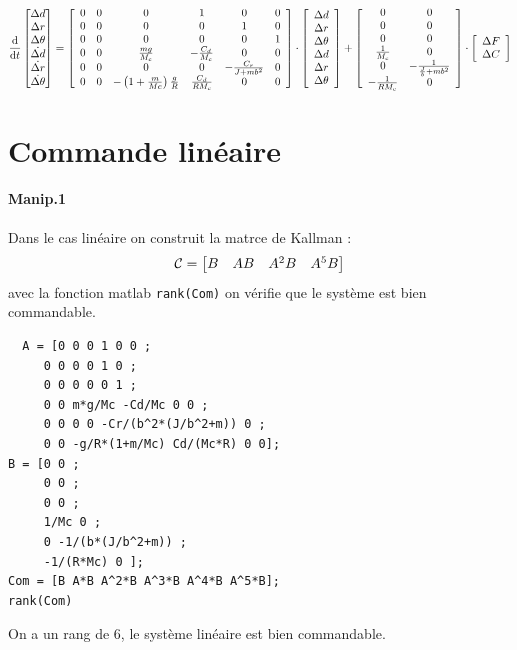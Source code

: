 \documentclass[10pt,a4paper,notitlepage]{article}
\begin{document}
\[
  \frac{\mbox{d}}{\mbox{d} t}\begin{bmatrix} \Delta d \\ \Delta r \\ \Delta\theta \\ \dot{\Delta d}\\ \dot{\Delta r}\\ \dot{\Delta \theta} \end{bmatrix} = 
  \left[ \begin{array}{cccccc}
           {0} & {0} & {0} & {1} & {0} & {0} \\
           {0} & {0} & {0} & {0} & {1} & {0} \\
           {0} & {0} & {0} & {0} & {0} & {1} \\
           {0} & {0} & {\frac{m g}{M_{c}}} & {-\frac{C_{d}}{M_{c}}} & {0} & {0} \\
           {0} & {0} & {0} & {0} & {-\frac{C_{r}}{J+m b^{2}}} & {0} \\
           {0} & {0} & {-\left(1+\frac{m}{M c}\right) \frac{g}{R}} & {\frac{C_{d}}{R M_{c}}} & {0} & {0}
         \end{array}\right] \cdot
       \left[ \begin{array}{c}{\Delta d} \\ {\Delta r} \\ {\Delta \theta} \\ {\Delta d} \\ {\Delta r} \\ {\Delta \theta}\end{array}\right]+
       \left[ \begin{array}{ccc}{0} & {0} \\ {0} & {0} \\ {0} & {0} \\ {\frac{1}{M_{c}}} & {0} \\ {0} & {-\frac{1}{\frac{J}{b}+m b^{2}}} \\ {-\frac{1}{R M_{c}}} & {0}\end{array}\right]
       \cdot \left[ \begin{array}{c}{\Delta F} \\ {\Delta C}\end{array}\right]
\]

\section{Commande linéaire}
\paragraph{Manip.1}
Dans le cas linéaire on construit la matrce de Kallman :
\[
  \mathcal{C} = \begin{bmatrix} B & AB & A^2B & A^5B  \end{bmatrix}
\]
avec la fonction matlab \texttt{rank(Com)} on vérifie que le système est bien commandable.
\begin{verbatim}
  A = [0 0 0 1 0 0 ; 
     0 0 0 0 1 0 ; 
     0 0 0 0 0 1 ; 
     0 0 m*g/Mc -Cd/Mc 0 0 ; 
     0 0 0 0 -Cr/(b^2*(J/b^2+m)) 0 ; 
     0 0 -g/R*(1+m/Mc) Cd/(Mc*R) 0 0];
B = [0 0 ; 
     0 0 ;
     0 0 ;
     1/Mc 0 ;
     0 -1/(b*(J/b^2+m)) ;
     -1/(R*Mc) 0 ];
Com = [B A*B A^2*B A^3*B A^4*B A^5*B];
rank(Com)
\end{verbatim}
On a un rang de 6, le système linéaire est bien commandable.
\end{document}
